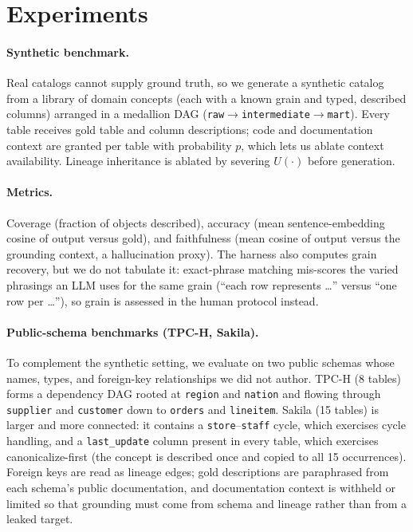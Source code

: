 \section{Experiments}
\paragraph{Synthetic benchmark.} Real catalogs cannot supply ground truth, so we generate a
synthetic catalog from a library of domain concepts (each with a known grain and typed,
described columns) arranged in a medallion DAG
(\texttt{raw}$\to$\texttt{intermediate}$\to$\texttt{mart}). Every table receives gold table
and column descriptions; code and documentation context are granted per table with
probability $p$, which lets us ablate context availability. Lineage inheritance is ablated
by severing $U(\cdot)$ before generation.
\paragraph{Metrics.} Coverage (fraction of objects described), accuracy (mean
sentence-embedding cosine of output versus gold), and faithfulness (mean cosine of output
versus the grounding context, a hallucination proxy). The harness also computes grain
recovery, but we do not tabulate it: exact-phrase matching mis-scores the varied phrasings
an LLM uses for the same grain (``each row represents \ldots'' versus ``one row per
\ldots''), so grain is assessed in the human protocol instead.
\paragraph{Public-schema benchmarks (TPC-H, Sakila).} To complement the synthetic setting,
we evaluate on two public schemas whose names, types, and foreign-key relationships we did
not author. TPC-H (8 tables) forms a dependency DAG rooted at \texttt{region} and
\texttt{nation} and flowing through \texttt{supplier} and \texttt{customer} down to
\texttt{orders} and \texttt{lineitem}. Sakila (15 tables) is larger and more connected: it
contains a \texttt{store}--\texttt{staff} cycle, which exercises cycle handling, and a
\texttt{last\_update} column present in every table, which exercises canonicalize-first
(the concept is described once and copied to all 15 occurrences). Foreign keys are read as
lineage edges; gold descriptions are paraphrased from each schema's public documentation,
and documentation context is withheld or limited so that grounding must come from schema
and lineage rather than from a leaked target.

